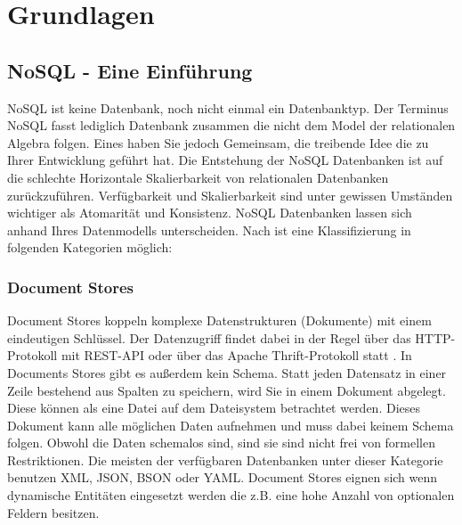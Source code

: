 
\chapter{Grundlagen}
\label{ch:grundlagen}

\section{NoSQL - Eine Einführung}
\label{ch:grundlagen:sec:NoSQL}

NoSQL ist keine Datenbank, noch nicht einmal ein Datenbanktyp. Der Terminus NoSQL fasst lediglich Datenbank zusammen die nicht dem Model der relationalen Algebra folgen. Eines haben Sie jedoch Gemeinsam, die treibende Idee die zu Ihrer Entwicklung geführt hat. Die Entstehung der NoSQL Datenbanken ist auf die schlechte Horizontale Skalierbarkeit von relationalen Datenbanken zurückzuführen. Verfügbarkeit und Skalierbarkeit sind unter gewissen Umständen wichtiger als Atomarität und Konsistenz. NoSQL Datenbanken lassen sich anhand Ihres Datenmodells unterscheiden. Nach \cite{vaish2013getting} ist eine Klassifizierung in folgenden Kategorien möglich:

\subsection{Document Stores}
\label{ch:grundlagen:sec:NoSQL:DocumentStores}

Document Stores koppeln komplexe Datenstrukturen (Dokumente) mit einem eindeutigen Schlüssel. Der Datenzugriff findet dabei in der Regel über das HTTP-Protokoll mit REST-API oder über das Apache Thrift-Protokoll statt \cite{agarwal2007thrift}. In Documents Stores gibt es außerdem kein Schema. Statt jeden Datensatz in einer Zeile bestehend aus Spalten zu speichern, wird Sie in einem Dokument abgelegt. Diese können als eine Datei auf dem Dateisystem betrachtet werden. Dieses Dokument kann alle möglichen Daten aufnehmen und muss dabei keinem Schema folgen. Obwohl die Daten schemalos sind, sind sie sind nicht frei von formellen Restriktionen. Die meisten der verfügbaren Datenbanken unter dieser Kategorie benutzen XML, JSON, BSON oder YAML. Document Stores eignen sich wenn dynamische Entitäten eingesetzt werden die z.B. eine hohe Anzahl von optionalen Feldern besitzen.

